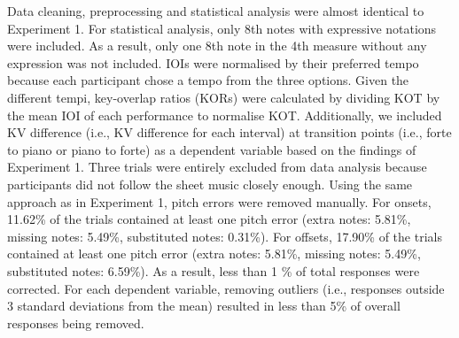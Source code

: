 \documentclass[
  man,floatsintext]{apa6}
\begin{document}
Data cleaning, preprocessing and statistical analysis were almost identical to Experiment 1. For statistical analysis, only 8th notes with expressive notations were included. As a result, only one 8th note in the 4th measure without any expression was not included. IOIs were normalised by their preferred tempo because each participant chose a tempo from the three options. Given the different tempi, key-overlap ratios (KORs) were calculated by dividing KOT by the mean IOI of each performance to normalise KOT. Additionally, we included KV difference (i.e., KV difference for each interval) at transition points (i.e., forte to piano or piano to forte) as a dependent variable based on the findings of Experiment 1. Three trials were entirely excluded from data analysis because participants did not follow the sheet music closely enough. Using the same approach as in Experiment 1, pitch errors were removed manually. For onsets, 11.62\% of the trials contained at least one pitch error (extra notes: 5.81\%, missing notes: 5.49\%, substituted notes: 0.31\%). For offsets, 17.90\% of the trials contained at least one pitch error (extra notes: 5.81\%, missing notes: 5.49\%, substituted notes: 6.59\%). As a result, less than 1 \% of total responses were corrected. For each dependent variable, removing outliers (i.e., responses outside 3 standard deviations from the mean) resulted in less than 5\% of overall responses being removed.
\end{document}
